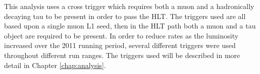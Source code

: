This analysis uses a cross trigger which requires both a muon and a hadronically decaying tau to be present in order to pass the HLT.
The triggers used are all based upon a single muon L1 seed, then in the HLT path both a muon and a tau object are required to be present.
In order to reduce rates as the luminosity increased over the 2011 running period, several different triggers were used throughout different run ranges. 
The triggers used will be described in more detail in Chapter \ref{chap:analysis}.

